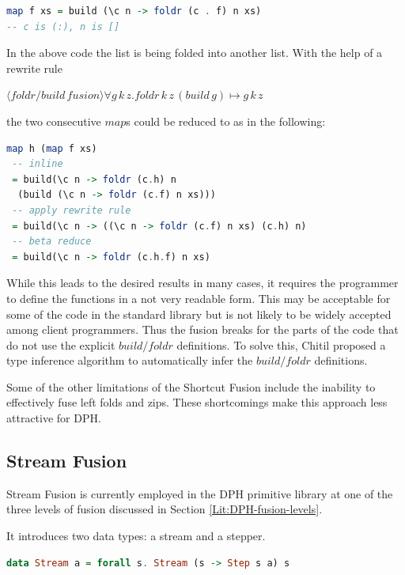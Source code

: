 \documentclass[preamble.tex]{subfiles}
\begin{document}
\begin{lstlisting}[basicstyle={\ttfamily},language=Haskell]
map f xs = build (\c n -> foldr (c . f) n xs)
-- c is (:), n is []
\end{lstlisting}


In the above code the list is being folded into another list. With the help of a rewrite rule

$\langle foldr/build\, fusion \rangle\forall g\, k\, z.foldr\, k\, z\,(build\, g)\mapsto g\, k\, z$

the two consecutive $map$s could be reduced to as in the following:

\begin{lstlisting}[basicstyle={\ttfamily},language=Haskell]
map h (map f xs)
 -- inline
 = build(\c n -> foldr (c.h) n 
  (build (\c n -> foldr (c.f) n xs)))
 -- apply rewrite rule
 = build(\c n -> ((\c n -> foldr (c.f) n xs) (c.h) n)
 -- beta reduce
 = build(\c n -> foldr (c.h.f) n xs)
\end{lstlisting}


While this leads to the desired results in many cases, it requires the programmer to define the functions in a not very readable form. This may be acceptable for some of the code in the standard library but is not likely to be widely accepted among client programmers. Thus the fusion breaks for the parts of the code that do not use the explicit $build/foldr$ definitions. To solve this, Chitil proposed a type inference algorithm to automatically infer the $build/foldr$ definitions\cite{Chi99}.

Some of the other limitations of the Shortcut Fusion include the inability to effectively fuse left folds and zips. These shortcomings make this approach less attractive for DPH.


\subsection{Stream Fusion}

Stream Fusion \cite{CLS07,CSL06} is currently employed in the DPH primitive library at one of the three levels of fusion discussed in Section \vref{Lit:DPH-fusion-levels}.

It introduces two data types: a stream and a stepper. 

\begin{lstlisting}[basicstyle={\ttfamily},language=Haskell]
data Stream a = forall s. Stream (s -> Step s a) s
\end{lstlisting}
\end{document}
